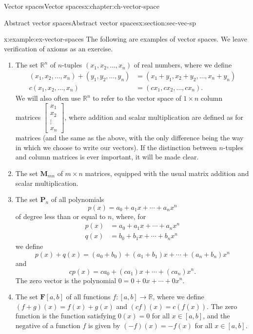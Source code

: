 \documentclass[oneside,10pt,]{book}
\numberwithin{equation}{section}
\newcommand{\bbm}{\begin{bmatrix}}
\newcommand{\ebm}{\end{bmatrix}}
\newcommand{\R}{\mathbb{R}}
\newcommand{\amp}{&}
\begin{document}
\begin{chapterptx}{Vector spaces}{}{Vector spaces}{}{}{x:chapter:ch-vector-space}
\begin{sectionptx}{Abstract vector spaces}{}{Abstract vector spaces}{}{}{x:section:sec-vec-sp}
\begin{example}{}{x:example:ex-vector-spaces}%
The following are examples of vector spaces. We leave verification of axioms as an exercise.%
\begin{enumerate}
\item{}The set \(\R^n\) of \(n\)-tuples \((x_1,x_2,\ldots, x_n)\) of real numbers, where we define%
\begin{align*}
(x_1,x_2,\ldots, x_n)+(y_1,y_2,\ldots, y_n) \amp = (x_1+y_1,x_2+y_2,\ldots, x_n+y_n) \\
c(x_1,x_2,\ldots, x_n)\amp = (cx_1,cx_2,\ldots, cx_n)\text{.}
\end{align*}
We will also often use \(\R^n\) to refer to the vector space of \(1\times n\) column matrices \(\bbm x_1\\x_2\\\vdots\\x_n\ebm\), where addition and scalar multiplication are defined as for matrices (and the same as the above, with the only difference being the way in which we choose to write our vectors). If the distinction between \(n\)-tuples and column matrices is ever important, it will be made clear.%
\item{}The set \(\mathbf{M}_{mn}\) of \(m\times n\) matrices, equipped with the usual matrix addition and scalar multiplication.%
\item{}The set \(\mathbf{P}_n\) of all polynomials%
\begin{equation*}
p(x) = a_0+a_1x+\cdots + a_nx^n
\end{equation*}
of degree less than or equal to \(n\), where, for%
\begin{align*}
p(x) \amp = a_0+a_1x+\cdots + a_nx^n \\
q(x) \amp = b_0+b_1x+\cdots +b_nx^n
\end{align*}
we define%
\begin{equation*}
p(x)+q(x)=(a_0+b_0)+(a_1+b_1)x+\cdots + (a_n+b_n)x^n
\end{equation*}
and%
\begin{equation*}
cp(x) = ca_0+(ca_1)x+\cdots + (ca_n)x^n\text{.}
\end{equation*}
The zero vector is the polynomial \(0=0+0x+\cdots + 0x^n\).%
\item{}The set \(\mathbf{F}[a,b]\) of all functions \(f:[a,b]\to \R\), where we define \((f+g)(x)=f(x)+g(x)\) and \((cf)(x)=c(f(x))\). The zero function is the function satisfying \(0(x)=0\) for all \(x\in [a,b]\), and the negative of a function \(f\) is given by \((-f)(x)=-f(x)\) for all \(x\in [a,b]\).%

\end{enumerate}
\end{example}
\end{sectionptx}
\end{chapterptx}
\end{document}
